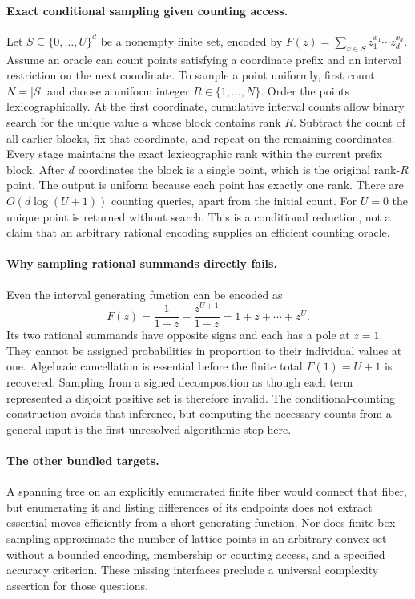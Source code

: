 \documentclass[11pt]{article}
\begin{document}
\paragraph{Exact conditional sampling given counting access.}
Let $S\subseteq\{0,\ldots,U\}^d$ be a nonempty finite set, encoded by
$F(z)=\sum_{x\in S}z_1^{x_1}\cdots z_d^{x_d}$. Assume an oracle can
count points satisfying a coordinate prefix and an interval restriction
on the next coordinate. To sample a point uniformly, first count $N=|S|$
and choose a uniform integer $R\in\{1,\ldots,N\}$.
Order the points lexicographically. At the first coordinate, cumulative
interval counts allow binary search for the unique value $a$ whose block
contains rank $R$. Subtract the count of all earlier blocks, fix that
coordinate, and repeat on the remaining coordinates. Every stage maintains
the exact lexicographic rank within the current prefix block. After $d$
coordinates the block is a single point, which is the original rank-$R$
point. The output is uniform because each point has exactly one rank.
There are $O(d\log(U+1))$ counting queries, apart from the initial count.
For $U=0$ the unique point is returned without search. This is a
conditional reduction, not a claim that an arbitrary rational encoding
supplies an efficient counting oracle.

\paragraph{Why sampling rational summands directly fails.}
Even the interval generating function can be encoded as
\[
F(z)=\frac1{1-z}-\frac{z^{U+1}}{1-z}=1+z+\cdots+z^U.
\]
Its two rational summands have opposite signs and each has a pole at
$z=1$. They cannot be assigned probabilities in proportion to their
individual values at one. Algebraic cancellation is essential before
the finite total $F(1)=U+1$ is recovered. Sampling from a signed
decomposition as though each term represented a disjoint positive set
is therefore invalid. The conditional-counting construction avoids that
inference, but computing the necessary counts from a general input is
the first unresolved algorithmic step here.

\paragraph{The other bundled targets.}
A spanning tree on an explicitly enumerated finite fiber would connect
that fiber, but enumerating it and listing differences of its endpoints
does not extract essential moves efficiently from a short generating
function. Nor does finite box sampling approximate the number of lattice
points in an arbitrary convex set without a bounded encoding, membership
or counting access, and a specified accuracy criterion. These missing
interfaces preclude a universal complexity assertion for those questions.
\end{document}
